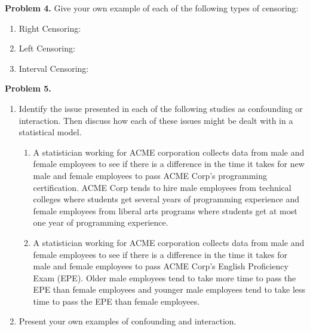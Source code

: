 \documentclass[12pt]{article}
\begin{document}
\textbf{Problem 4.}
Give your own example of each of the following types of censoring:
\begin{enumerate}
\item Right Censoring:
\item Left Censoring:
\item Interval Censoring:
\end{enumerate}
\newpage
\textbf{Problem 5.}
\begin{enumerate}
\item 
Identify the issue presented in each of the following studies as confounding or interaction. Then discuss how each of these issues might be dealt with in a statistical model.
\begin{enumerate}
\item A statistician working for ACME corporation collects data from male and female employees to see if there is a difference in the time it takes for new male and female employees to pass ACME Corp's programming certification. ACME Corp tends to hire male employees from technical colleges where students get several years of programming experience and female employees from liberal arts programs where students get at most one year of programming experience.
\item  A statistician working for ACME corporation collects data from male and female employees to see if there is a difference in the time it takes for male and female employees to pass ACME Corp's English Proficiency Exam (EPE). Older male employees tend to take more time to pass the EPE than female employees and younger male employees tend to take less time to pass the EPE than female employees.
\end{enumerate}
\item Present your own examples of confounding and interaction. 
\end{enumerate} 
\end{document}
